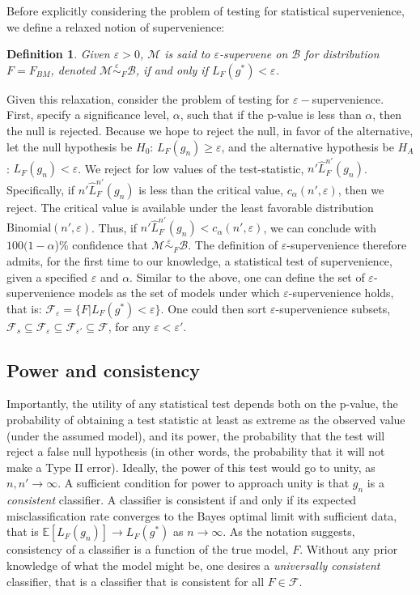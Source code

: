 \documentclass{article}
\newcommand{\conv}{\rightarrow}
\newcommand{\mB}{\mathcal{B}}
\newcommand{\mM}{\mathcal{M}}
\newcommand{\EE}{\mathbb{E}}           %
\newcommand{\eps}{\varepsilon}
\providecommand{\mc}[1]{\mathcal{#1}}
\newcommand{\hL}{\widehat{L}}
\newcommand{\MeB}{\mM \overset{\varepsilon}{{\sim}}_F \mB}
\newtheorem{defi}{Definition}
\begin{document}
Before explicitly considering the problem of testing for statistical supervenience, we define a relaxed notion of supervenience:
\begin{defi}
\label{def2}
Given $\varepsilon > 0$, $\mM$ is said to $\varepsilon$-\textit{supervene} on $\mB$ for distribution $F=F_{BM}$, denoted $\MeB$, if and only if $L_{F}(g^*) < \varepsilon$.
\end{defi}

Given this relaxation, consider the problem of testing for $\eps-$supervenience.  First, specify a significance level, $\alpha$, such that if the p-value is less than $\alpha$, then the null is rejected.  Because we hope to reject the null, in favor of the alternative, let the null hypothesis be $H_0$: $L_{F}(g_n) \geq \eps$, and the alternative hypothesis be $H_A$: $L_{F}(g_n) < \eps$.  We reject for low values of the test-statistic, $n' \hL^{n'}_{F}(g_n)$.  Specifically, if $n' \hL^{n'}_{F}(g_n)$ is less than the critical value,  $c_{\alpha}(n',\varepsilon)$, then we reject.  The critical value is available under the least favorable distribution $\text{Binomial}(n',\varepsilon)$.  Thus, if $n' \hL^{n'}_{F}(g_n) < c_{\alpha}(n',\varepsilon)$, we can conclude with $100(1-\alpha$)\% confidence that $\MeB$.  The definition of $\eps$-supervenience therefore admits, for the first time to our knowledge, a statistical test of supervenience, given a specified $\eps$ and $\alpha$. Similar to the above, one can define the set of $\eps$-supervenience models as the set of models under which $\eps$-supervenience holds, that is: $\mc{F}_\eps = \{F | L_F(g^*)< \eps\}$.  One could then sort  $\eps$-supervenience subsets,  $\mc{F}_s \subseteq \mc{F}_{\eps} \subseteq \mc{F}_{\eps'} \subseteq \mc{F}$, for any $\eps < \eps'$.


\subsection{Power and consistency} %
\label{ssub:power_and_consistency}


Importantly, the utility of any statistical test depends both on the p-value, the probability of obtaining a test statistic at least as extreme as the observed value (under the assumed model), and its power, the probability that the test will reject a false null hypothesis (in other words, the probability that it will not make a Type II error).  Ideally, the power of this test would go to unity, as $n,n' \rightarrow \infty$.  A sufficient condition for power to approach unity is that $g_n$ is a \emph{consistent} classifier.  A classifier is consistent if and only if its expected misclassification rate converges to the Bayes optimal limit with sufficient data, that is $\EE[L_F(g_n)] \conv L_F(g^*)$ as $n\conv \infty$. As the notation suggests, consistency of a classifier is a function of the true model, $F$.  Without any prior knowledge of what the model might be, one desires a \emph{universally consistent} classifier, that is a classifier that is consistent for all $F \in \mc{F}$.  
\end{document}
